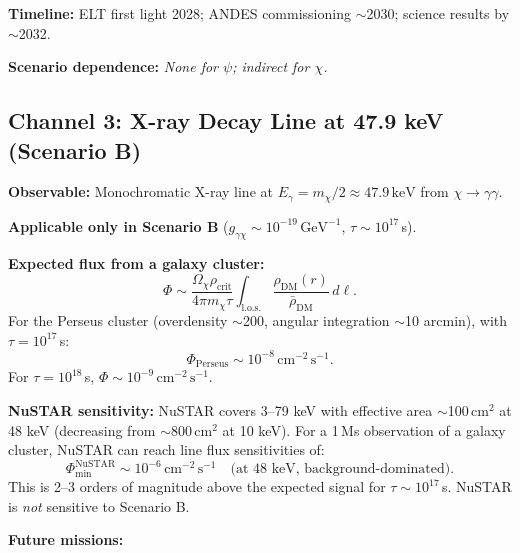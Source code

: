 \documentclass[12pt,a4paper]{article}
\newcommand{\keV}{\,\mathrm{keV}}
\newcommand{\cms}{\,\mathrm{cm}^{-2}\,\mathrm{s}^{-1}}
\begin{document}
\textbf{Timeline:} ELT first light 2028; ANDES commissioning $\sim$2030;
science results by $\sim$2032.

\textbf{Scenario dependence:} \emph{None for $\psi$; indirect for $\chi$.}

\begin{center}
\end{center}

\subsection{Channel 3: X-ray Decay Line at 47.9 keV (Scenario B)}
\label{sec:xray}

\textbf{Observable:} Monochromatic X-ray line at
$E_\gamma = m_\chi/2 \approx 47.9\keV$ from $\chi \to \gamma\gamma$.

\textbf{Applicable only in Scenario B}
($g_{\gamma\chi} \sim 10^{-19}\,\mathrm{GeV}^{-1}$,
$\tau \sim 10^{17}$\,s).

\textbf{Expected flux from a galaxy cluster:}
\begin{equation}
\Phi \sim \frac{\Omega_\chi \rho_\mathrm{crit}}{4\pi m_\chi \tau}
\int_\mathrm{l.o.s.} \frac{\rho_\mathrm{DM}(r)}{\bar{\rho}_\mathrm{DM}}\,d\ell.
\end{equation}
For the Perseus cluster (overdensity $\sim$200, angular integration
$\sim$10 arcmin), with $\tau = 10^{17}$\,s:
\begin{equation}
\Phi_\mathrm{Perseus} \sim 10^{-8}\cms.
\end{equation}
For $\tau = 10^{18}$\,s, $\Phi \sim 10^{-9}\cms$.

\textbf{NuSTAR sensitivity:} NuSTAR covers 3--79 keV with effective
area $\sim$100\,cm$^2$ at 48 keV (decreasing from $\sim$800\,cm$^2$ at
10 keV). For a 1\,Ms observation of a galaxy cluster, NuSTAR can reach
line flux sensitivities of:
\begin{equation}
\Phi_\mathrm{min}^\mathrm{NuSTAR} \sim 10^{-6}\cms
\quad\text{(at 48 keV, background-dominated).}
\end{equation}
This is 2--3 orders of magnitude above the expected signal for
$\tau \sim 10^{17}$\,s. NuSTAR is \emph{not} sensitive to Scenario B.

\textbf{Future missions:}
\end{document}
